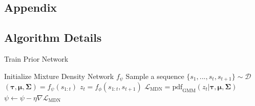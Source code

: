 \documentclass{article}
\begin{document}
%

\newpage




\newpage

\begin{appendices}
  \section{Appendix}

  \subsection{Algorithm Details}

  \begin{minipage}[t]{7cm}
    \vspace{0pt}

    \begin{algorithm}[H]
      \caption{Train Prior Network}
      \begin{algorithmic}[1]
        \State Initialize Mixture Density Network $f_\psi$
        \State Sample a sequence $\{s_1, ..., s_t, s_{t+1}\} \sim \mathcal{D}$
        \State $(\bm{\tau}, \bm{\mu}, \bm{\Sigma}) = f_{\psi}(s_{1:t})$
        \State $z_t = f_{\phi}(s_{1:t}, s_{t+1})$
        \State $\mathcal{L}_\text{MDN} = \text{pdf}_\text{GMM}(z_t | \bm{\tau}, \bm{\mu}, \bm{\Sigma})$\footnotemark
        \State $\psi \gets \psi - \eta \nabla \mathcal{L}_\text{MDN}$
        \EndWhile
      \end{algorithmic}
    \end{algorithm}
  \end{minipage}%
  \begin{minipage}[t]{7cm}
    \vspace{0pt}


\end{minipage}
\end{appendices}
\end{document}
